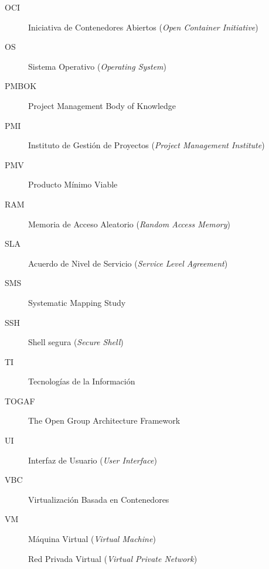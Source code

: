 \begin{description}
  \item[OCI] Iniciativa de Contenedores Abiertos (\textit{Open Container Initiative})
  \item[OS] Sistema Operativo (\textit{Operating System})
  \item[PMBOK] Project Management Body of Knowledge
  \item[PMI] Instituto de Gestión de Proyectos (\textit{Project Management Institute})
  \item[PMV] Producto Mínimo Viable
  \item[RAM] Memoria de Acceso Aleatorio (\textit{Random Access Memory})
  \item[SLA] Acuerdo de Nivel de Servicio (\textit{Service Level Agreement})
  \item[SMS] Systematic Mapping Study
  \item[SSH] Shell segura (\textit{Secure Shell})
  \item[TI] Tecnologías de la Información
  \item[TOGAF] The Open Group Architecture Framework
  \item[UI] Interfaz de Usuario (\textit{User Interface})
  \item[VBC] Virtualización Basada en Contenedores
  \item[VM] Máquina Virtual (\textit{Virtual Machine})
  \item[\VPN] Red Privada Virtual (\textit{Virtual Private Network})
\end{description}